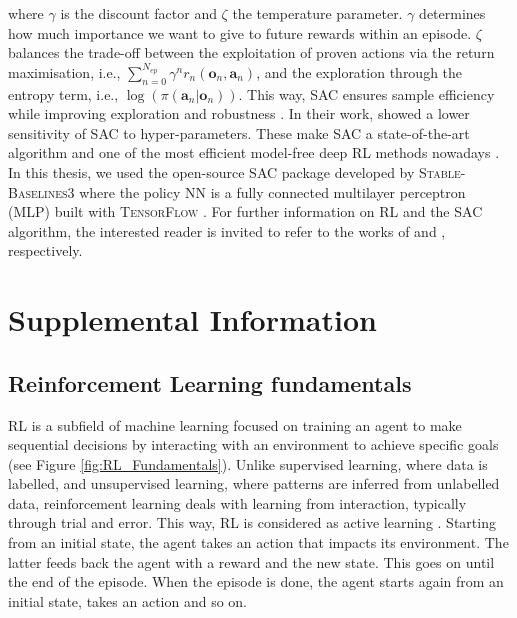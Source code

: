 \documentclass[11pt,twoside,a4paper,english]{article}
\def\ie{i.e., }
\begin{document}
\noindent
where $\gamma$ is the discount factor and $\zeta$ the temperature parameter. $\gamma$ determines how much importance we want to give to future rewards within an episode. $\zeta$ balances the trade-off between the exploitation of proven actions via the return maximisation, \ie $\sum_{n=0}^{N_{ep}}\gamma^n r_n\left(\bm{o}_n,\bm{a}_n \right)$, and the exploration through the entropy term, \ie $\log \left(\pi\left(\bm{a}_n | \bm{o}_n\right) \right)$. This way, \gls{SAC} ensures sample efficiency while improving exploration \cite{haarnoja2017reinforcement} and robustness \cite{ziebart2010modeling}. In their work, \citet{haarnoja2017reinforcement} showed a lower sensitivity of \gls{SAC} to hyper-parameters. These make \gls{SAC} a state-of-the-art algorithm and one of the most efficient model-free deep RL methods nowadays \cite{haarnoja2017reinforcement}. In this thesis, we used the open-source \gls{SAC} package developed by \textsc{Stable-Baselines3} \cite{raffin2021stable} where the policy \gls{NN} is a fully connected multilayer perceptron (MLP) built with \textsc{TensorFlow} \cite{abadi2016tensorflow}. For further information on \gls{RL} and the \gls{SAC} algorithm, the interested reader is invited to refer to the works of \citet{sutton2018reinforcement} and \citet{haarnoja2018soft}, respectively.



\section{Supplemental Information}

\subsection[Reinforcement Learning fundamentals]{Reinforcement Learning fundamentals}
\label{subsec:meth_RL_fundamentals}

\Gls{RL} is a subfield of machine learning focused on training an agent to make sequential decisions by interacting with an environment to achieve specific goals (see Figure \ref{fig:RL_Fundamentals}). Unlike supervised learning, where data is labelled, and unsupervised learning, where patterns are inferred from unlabelled data, reinforcement learning deals with learning from interaction, typically through trial and error. This way, \gls{RL} is considered as active learning \cite{cao2020reinforcement}. Starting from an initial state, the agent takes an action that impacts its environment. The latter feeds back the agent with a reward and the new state. This goes on until the end of the episode. When the episode is done, the agent starts again from an initial state, takes an action and so on. 
\end{document}
